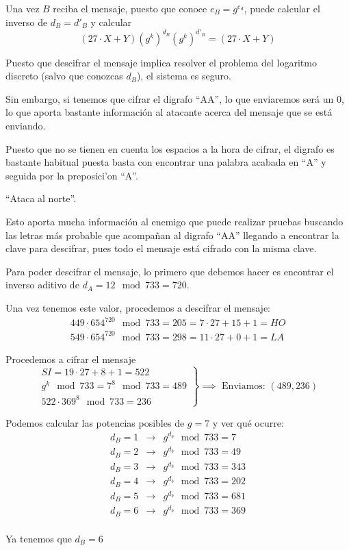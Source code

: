 \begin{problem}[2]
Una vez $B$ reciba el mensaje, puesto que conoce $e_B=g^{e_d}$, puede calcular el inverso de $d_B=d'_B$ y calcular
\[(27\cdot X + Y)(g^k)^{d_B}(g^k)^{d'_B}=(27\cdot X +Y)\]

Puesto que descifrar el mensaje implica resolver el problema del logaritmo discreto (salvo que conozcas $d_B$), el sistema es seguro.

Sin embargo, si tenemos que cifrar el digrafo ``AA'', lo que enviaremos será un 0, lo que aporta bastante información al atacante acerca del mensaje que se está enviando.

Puesto que no se tienen en cuenta los espacios a la hora de cifrar, el digrafo es bastante habitual puesta basta con encontrar una palabra acabada en ``A'' y seguida por la preposici'on ``A''.

``Ataca al norte''.

Esto aporta mucha información al enemigo que puede realizar pruebas buscando las letras más probable que acompañan al digrafo ``AA'' llegando a encontrar la clave para descifrar, pues todo el mensaje está cifrado con la misma clave.

\spart
Para poder descifrar el mensaje, lo primero que debemos hacer es encontrar el inverso aditivo de $d_A=12 \mod  733 = 720$.

Una vez tenemos este valor, procedemos a descifrar el mensaje:
\[\begin{array}{l}
449 \cdot 654^{720} \mod 733 = 205 = 7\cdot 27 + 15 + 1 = HO\\
549 \cdot 654^{720} \mod 733 = 298 = 11 \cdot 27 + 0 + 1 = LA
\end{array}\]

\spart
Procedemos a cifrar el mensaje
\[\left.\begin{array}{l}
SI = 19 \cdot 27 + 8 +1 = 522\\
g^k \mod 733 = 7^8 \mod 733 = 489 \\
522 \cdot 369^{8} \mod 733 =236
\end{array}\right\}\implies \text{ Enviamos: } (489,236) \]

\spart

Podemos calcular las potencias posibles de $g=7$ y ver qué ocurre:
\[\begin{array}{lcl}
d_B=1 & \to & g^{d_b} \mod 733= 7\\
d_B=2 & \to & g^{d_b} \mod 733= 49\\
d_B=3 & \to & g^{d_b} \mod 733= 343\\
d_B=4 & \to & g^{d_b} \mod 733= 202\\
d_B=5 & \to & g^{d_b} \mod 733= 681\\
d_B=6 & \to & g^{d_b} \mod 733= 369\\
\end{array}\]

Ya tenemos que $d_B=6$

\end{problem}


